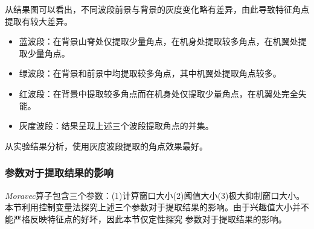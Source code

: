     从结果图可以看出，不同波段前景与背景的灰度变化略有差异，由此导致特征角点提取有较大差异。
        \begin{itemize}
            \item 蓝波段：在背景山脊处仅提取少量角点，在机身处提取较多角点，在机翼处提取少量角点。
            \item 绿波段：在背景和前景中均提取较多角点，其中机翼处提取角点较多。
            \item 红波段：在背景中提取较多角点而在机身处仅提取少量角点，在机翼处完全失能。
            \item 灰度波段：结果呈现上述三个波段提取角点的并集。
        \end{itemize}    
    从实验结果分析，使用灰度波段提取的角点效果最好。

    \subsubsection{参数对于提取结果的影响}
        \textit{Moravec}算子包含三个参数：(1)计算窗口大小(2)阈值大小(3)极大抑制窗口大小。
        本节利用控制变量法探究上述三个参数对于提取结果的影响。由于兴趣值大小并不能严格反映特征点的好坏，因此本节仅定性探究
        参数对于提取结果的影响。
